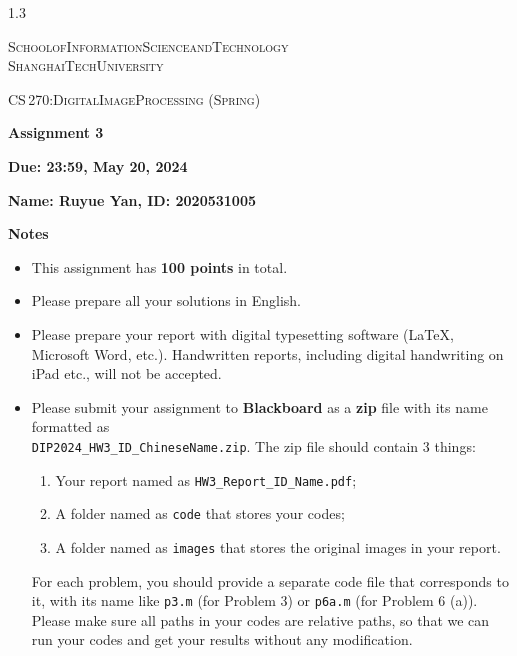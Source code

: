 \documentclass[A4paper, 11pt]{article}
\newcommand{\<}{\,\langle\,}
\renewcommand{\>}{\,\rangle}
\newcommand{\0}{\mathbf{0}}
\newcommand{\1}{\mathbf{1}}
\newcommand{\typeset}{
    \setlength{\parindent}{0pt}
    \setlength{\parskip}{1ex}
    \setlength{\abovedisplayskip}{1ex}
    \setlength{\belowdisplayskip}{1ex}
}
\begin{document}
\begin{spacing}{1.3}

\typeset

\textsc{\large{School\;of\;Information\;Science\;and\;Technology\\[2pt] ShanghaiTech\;University}}

\vspace*{5ex}

\textsc{\large{CS\,270:\;Digital\;Image\;Processing (Spring)}}

\vspace*{2.5ex} \textbf{\huge{Assignment 3}}

\vspace*{1.5ex} \textbf{\large{Due: 23:59, May 20, 2024}}

\vspace*{1.5ex} \textbf{\large{Name: Ruyue Yan, ID: 2020531005}}

\vspace*{5ex}

\textbf{\large{Notes}}

\begin{itemize} \setlength{\parskip}{0.5ex} \vspace*{-1ex} 
    \item This assignment has \textbf{100 points} in total.
    \item Please prepare all your solutions in English.
    \item Please prepare your report with digital typesetting software (LaTeX, Microsoft Word, etc.). Handwritten reports, including digital handwriting on iPad etc., will not be accepted.
    \item Please submit your assignment to \textbf{Blackboard} as a \textbf{zip} file with its name formatted as\\ \texttt{DIP2024\_HW3\_ID\_ChineseName.zip}. The zip file should contain 3 things:
    \begin{enumerate}
        \item Your report named as \texttt{HW3\_Report\_ID\_Name.pdf};
        \item A folder named as \texttt{code} that stores your codes;
        \item A folder named as \texttt{images} that stores the original images in your report.
    \end{enumerate}
    For each problem, you should provide a separate code file that corresponds to it, with its name like \texttt{p3.m} (for Problem 3) or \texttt{p6a.m} (for Problem 6 (a)). Please make sure all paths in your codes are relative paths, so that we can run your codes and get your results without any modification.
\end{itemize}


\end{spacing}
\end{document}
